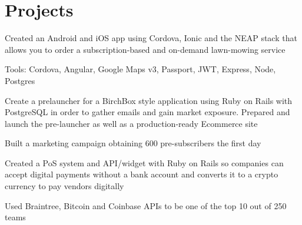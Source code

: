 \documentclass[]{deedy-resume-openfont}
\begin{document}
\begin{minipage}[t]{0.66\textwidth}

\section{Projects}
\begin{tightemize}\item Created an Android and iOS app using Cordova, Ionic and the NEAP stack that allows you to order a subscription-based and on-demand lawn-mowing service
\item Tools: Cordova, Angular, Google Maps v3, Passport, JWT, Express, Node, Postgres
\end{tightemize}
\sectionsep

\begin{tightemize}\item Create a prelauncher for a BirchBox style application using Ruby on Rails with PostgreSQL in order to gather emails and gain market exposure. Prepared and launch the pre-launcher as well as a production-ready Ecommerce site
\item Built a marketing campaign obtaining 600 pre-subscribers the first day
\end{tightemize}
\sectionsep

\begin{tightemize}\item Created a PoS system and API/widget with Ruby on Rails so companies can accept digital payments without a bank account and converts it to a crypto currency to pay vendors digitally
\item Used Braintree, Bitcoin and Coinbase APIs to be one of the top 10 out of 250 teams
\end{tightemize}
\sectionsep

\end{minipage}
\end{document}

